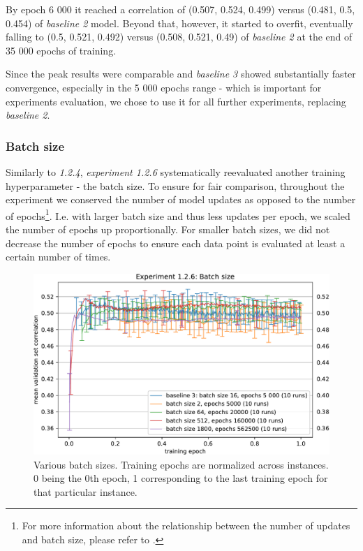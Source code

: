 By epoch 6 000 it reached a correlation of (0.507, 0.524, 0.499) versus (0.481, 0.5, 0.454) of \emph{baseline 2} model. Beyond that, however, it started to overfit, eventually falling to (0.5, 0.521, 0.492) versus (0.508, 0.521, 0.49) of \emph{baseline 2} at the end of 35 000 epochs of training. 

Since the peak results were comparable and \emph{baseline 3} showed substantially faster convergence, especially in the 5 000 epochs range - which is important for experiments evaluation, we chose to use it for all further experiments, replacing \emph{baseline 2}.

\subsubsection{Batch size}

Similarly to \textit{1.2.4}, \textit{experiment 1.2.6} systematically reevaluated another training hyperparameter - the batch size. To ensure for fair comparison, throughout the experiment we conserved the number of model updates as opposed to the number of epochs\footnote{For more information about the relationship between the number of updates and batch size, please refer to .}. I.e. with larger batch size and thus less updates per epoch, we scaled the number of epochs up proportionally. For smaller batch sizes, we did not decrease the number of epochs to ensure each data point is evaluated at least a certain number of times.

\begin{figure}[H]
    \centering
    \includegraphics[width=1\textwidth]{../figures/05_1_2_6}
    \caption[Experiment 1.2.6]{Various batch sizes. Training epochs are normalized across instances. 0 being the 0th epoch, 1 corresponding to the last training epoch for that particular instance.}
    \label{fig:5.1.2.6}
\end{figure}

